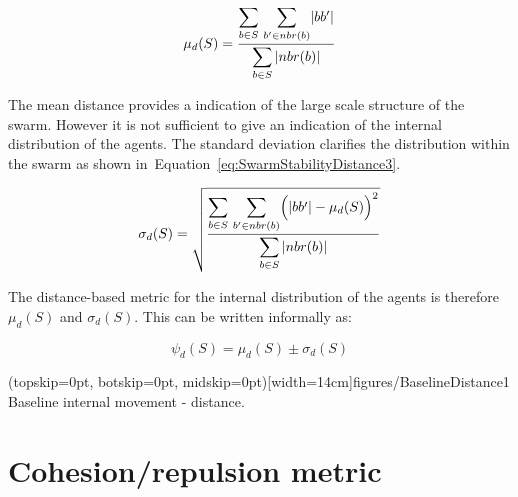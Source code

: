\documentclass{ieeeaccess}
\begin{document}
\begin{equation}
\label{eq:SwarmStabilityDistance2}
\mu_d(S) = \frac{\mathlarger{\sum_{b \in S}}~\mathlarger{\sum_{b' \in nbr(b)}}|bb'|}{\mathlarger{\sum_{b \in S}|nbr(b)|}}
\end{equation}

The mean distance provides a indication of the large scale structure of the swarm. However it is not sufficient to give an indication of the internal distribution of the agents. The standard deviation clarifies the distribution within the swarm as shown in~Equation~\ref{eq:SwarmStabilityDistance3}. 


\begin{equation}
\label{eq:SwarmStabilityDistance3}
\sigma_d(S) = \sqrt{\frac{\mathlarger{\sum_{b \in S}}~\mathlarger{\sum_{b' \in nbr(b)}}\Big(|bb'| - \mu_d(S)\Big)^2}{\mathlarger{\sum_{b \in S}|nbr(b)|}}}
\end{equation}

The distance-based metric for the internal distribution of the agents is therefore $\mu_d(S)$ and $\sigma_d(S)$. This can be written informally as:

\begin{equation}
\label{eq:SwarmDistanceMetric}
\psi_d(S) = \mu_d(S)\pm \sigma_d(S)
\end{equation}

\Figure[t!](topskip=0pt, botskip=0pt, midskip=0pt)[width=14cm]{figures/BaselineDistance1}
{Baseline internal movement - distance.\label{coord:BaselineDistance1}}


\section{Cohesion/repulsion metric}\label{Section:MagnitudeDynamics}
\end{document}
